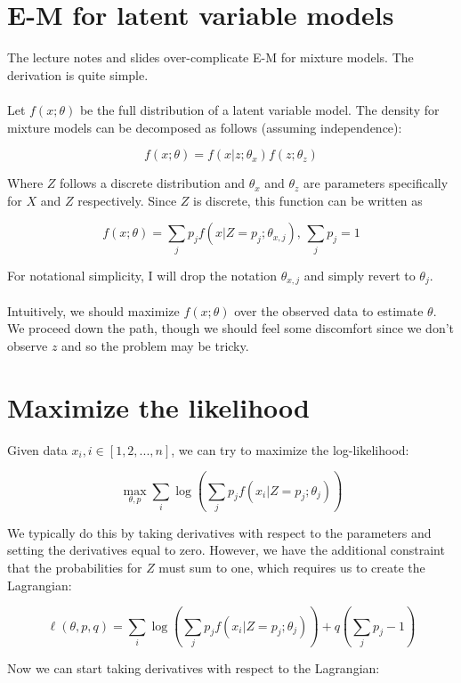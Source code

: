 \documentclass{article}
\begin{document}
\section{E-M for latent variable models}

The lecture notes and slides over-complicate E-M for mixture models.  The derivation is quite simple.
\\
\\

Let \(f(x; \theta)\) be the full distribution of a latent variable model.  The density for mixture models can be decomposed as follows (assuming independence):

\[f(x; \theta)=f(x|z; \theta_x)f(z; \theta_z )\] 

Where \(Z\) follows a discrete distribution and \(\theta_x\) and \(\theta_z\) are parameters specifically for \(X\) and \(Z\) respectively.  Since \(Z\) is discrete, this function can be written as 

\[f(x; \theta)=\sum_j p_j f(x|Z=p_j; \theta_{x, j}),\,\sum_j p_j =1\]

For notational simplicity, I will drop the notation \(\theta_{x, j}\) and simply revert to \(\theta_j\).
\\
\\
Intuitively, we should maximize \(f(x; \theta)\) over the observed data to estimate \(\theta\).  We proceed down the path, though we should feel some discomfort since we don't observe \(z\) and so the problem may be tricky.

\section{Maximize the likelihood}

Given data \(x_i, i\in [1, 2, ..., n]\), we can try to maximize the log-likelihood:

\[\max_{\theta, p} \sum_i \log\left(\sum_j p_j f(x_i|Z=p_j; \theta_j)\right)\]
 
We typically do this by taking derivatives with respect to the parameters and setting the derivatives equal to zero.  However, we have the additional constraint that the probabilities for \(Z\) must sum to one, which requires us to create the Lagrangian:

\[\ell(\theta, p, q)=\sum_i \log\left(\sum_j p_j f(x_i|Z=p_j; \theta_j)\right)+q\left(\sum_j p_j-1\right)\]

Now we can start taking derivatives with respect to the Lagrangian:
\end{document}
